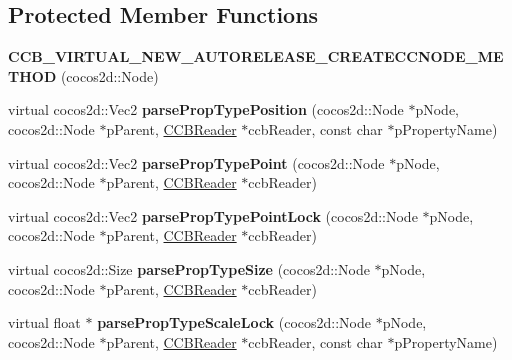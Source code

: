 \subsection*{Protected Member Functions}
\begin{DoxyCompactItemize}
\item 
\mbox{\label{classcocosbuilder_1_1NodeLoader_a44b0f2a9f4f9074d024e2305b4c1b8e8}} 
{\bfseries C\+C\+B\+\_\+\+V\+I\+R\+T\+U\+A\+L\+\_\+\+N\+E\+W\+\_\+\+A\+U\+T\+O\+R\+E\+L\+E\+A\+S\+E\+\_\+\+C\+R\+E\+A\+T\+E\+C\+C\+N\+O\+D\+E\+\_\+\+M\+E\+T\+H\+OD} (cocos2d\+::\+Node)
\item 
\mbox{\label{classcocosbuilder_1_1NodeLoader_a2a7e697b6dd58e76b59f39c6c7c7e221}} 
virtual cocos2d\+::\+Vec2 {\bfseries parse\+Prop\+Type\+Position} (cocos2d\+::\+Node $\ast$p\+Node, cocos2d\+::\+Node $\ast$p\+Parent, \hyperlink{classcocosbuilder_1_1CCBReader}{C\+C\+B\+Reader} $\ast$ccb\+Reader, const char $\ast$p\+Property\+Name)
\item 
\mbox{\label{classcocosbuilder_1_1NodeLoader_a29c8c5612ba60462ef2e0ff628b19df6}} 
virtual cocos2d\+::\+Vec2 {\bfseries parse\+Prop\+Type\+Point} (cocos2d\+::\+Node $\ast$p\+Node, cocos2d\+::\+Node $\ast$p\+Parent, \hyperlink{classcocosbuilder_1_1CCBReader}{C\+C\+B\+Reader} $\ast$ccb\+Reader)
\item 
\mbox{\label{classcocosbuilder_1_1NodeLoader_a3b938d15357bc78a32909b887e5f4f5a}} 
virtual cocos2d\+::\+Vec2 {\bfseries parse\+Prop\+Type\+Point\+Lock} (cocos2d\+::\+Node $\ast$p\+Node, cocos2d\+::\+Node $\ast$p\+Parent, \hyperlink{classcocosbuilder_1_1CCBReader}{C\+C\+B\+Reader} $\ast$ccb\+Reader)
\item 
\mbox{\label{classcocosbuilder_1_1NodeLoader_a6ffcace492cf072aa8f54fa92aabad41}} 
virtual cocos2d\+::\+Size {\bfseries parse\+Prop\+Type\+Size} (cocos2d\+::\+Node $\ast$p\+Node, cocos2d\+::\+Node $\ast$p\+Parent, \hyperlink{classcocosbuilder_1_1CCBReader}{C\+C\+B\+Reader} $\ast$ccb\+Reader)
\item 
\mbox{\label{classcocosbuilder_1_1NodeLoader_a9e99bf031bbae64d5588be74fa880ccf}} 
virtual float $\ast$ {\bfseries parse\+Prop\+Type\+Scale\+Lock} (cocos2d\+::\+Node $\ast$p\+Node, cocos2d\+::\+Node $\ast$p\+Parent, \hyperlink{classcocosbuilder_1_1CCBReader}{C\+C\+B\+Reader} $\ast$ccb\+Reader, const char $\ast$p\+Property\+Name)

\end{DoxyCompactItemize}

